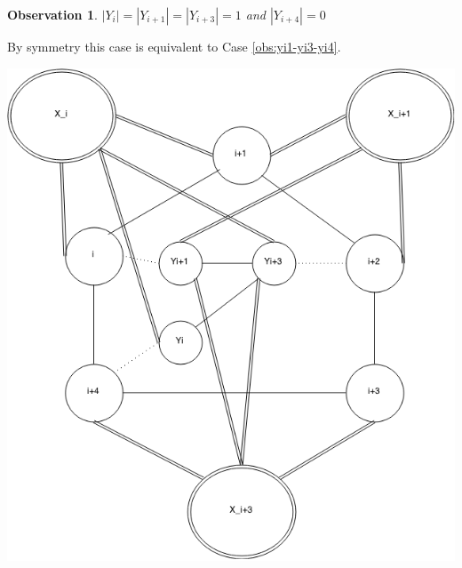\documentclass[12pt]{article}
\newtheorem{Observation}[Theorem]{Observation}
\begin{document}
\begin{Observation}\label{obs:yi-yi1-yi3} 
$ |Y_{i}| = |Y_{i+1}| = |Y_{i+3}| = 1$ and $|Y_{i+4}| = 0$
\end{Observation}
\begin{minipage}{0.5\textwidth}%
	 By symmetry this case is equivalent to Case \ref{obs:yi1-yi3-yi4}.
\end{minipage}
\hfill
\begin{minipage}{0.5\textwidth}\raggedleft
	\includegraphics[width=\linewidth]{Yi-Yi1-Yi3.png}
\end{minipage}
\end{document}
